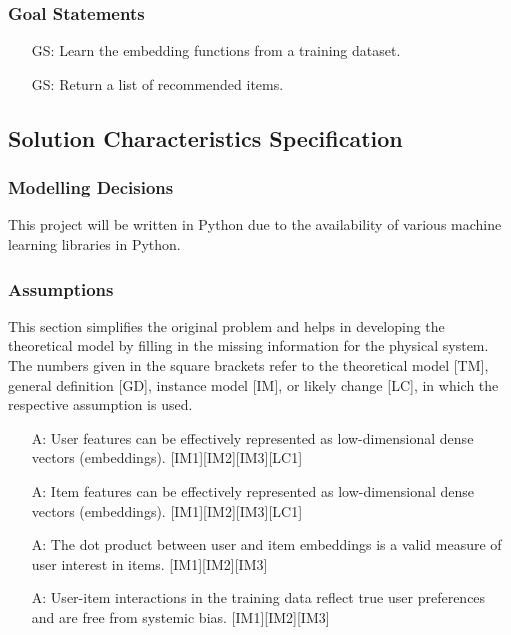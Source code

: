 \documentclass[12pt]{article}
\newcounter{assumpnum} %
\newcounter{goalnum} %
\begin{document}
\subsubsection{Goal Statements}


\begin{itemize}

\item[GS\refstepcounter{goalnum}\thegoalnum \label{GS1}:] Learn the embedding functions from a training dataset.
\item[GS\refstepcounter{goalnum}\thegoalnum \label{GS2}:] Return a list of recommended items.
\end{itemize}


\subsection{Solution Characteristics Specification}

\subsubsection{Modelling Decisions}

This project will be written in Python due to the availability of various machine learning libraries in Python.

\subsubsection{Assumptions} \label{sec_assumpt}

This section simplifies the original problem and helps in developing the
theoretical model by filling in the missing information for the physical system.
The numbers given in the square brackets refer to the theoretical model [TM],
general definition [GD], instance model [IM], or likely
change [LC], in which the respective assumption is used.

\begin{itemize}

\item[A\refstepcounter{assumpnum}\theassumpnum \label{A_Embedding1}:]
User features can be effectively represented as low-dimensional dense vectors (embeddings). [IM1][IM2][IM3][LC1]

\item[A\refstepcounter{assumpnum}\theassumpnum \label{A_Embedding2}:]
Item features can be effectively represented as low-dimensional dense vectors (embeddings). [IM1][IM2][IM3][LC1]


\item[A\refstepcounter{assumpnum}\theassumpnum \label{A_DotProduct}:]
The dot product between user and item embeddings is a valid measure of user interest in items. [IM1][IM2][IM3]

\item[A\refstepcounter{assumpnum}\theassumpnum \label{A_DataQuality}:]
User-item interactions in the training data reflect true user preferences and are free from systemic bias. [IM1][IM2][IM3]

\end{itemize}
\end{document}
